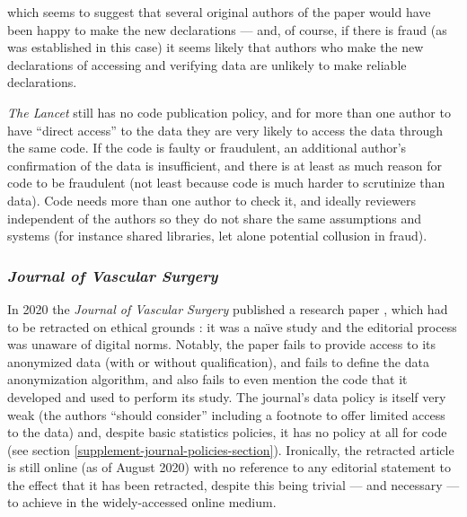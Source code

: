 \documentclass[10pt,a4paper]{article}
\begin{document}
which seems to suggest that several original authors of the paper would have been happy to make the new declarations --- and, of course, if there is fraud (as was established in this case) it seems likely that authors who make the new declarations of accessing and verifying data are unlikely to make reliable declarations. 

\emph{The Lancet\/} still has no code publication policy, and for more than one author to have ``direct access'' to the data they are very likely to access the data through the same code. If the code is faulty or fraudulent, an additional author's confirmation of the data is insufficient, and there is at least as much reason for code to be fraudulent (not least because code is much harder to scrutinize than data). Code needs more than one author to check it, and ideally reviewers independent of the authors so they do not share the same assumptions and systems (for instance shared libraries, let alone potential collusion in fraud).

\subsubsection{\emph{Journal of Vascular Surgery}}\label{supplement-vascular-surgery-note}
In 2020 the \emph{Journal of Vascular Surgery\/} published a research paper \cite{jvs1}, which had to be retracted on ethical grounds \cite{jvs2,jvs3}: it was a na\"\i ve study and the editorial process was unaware of digital norms. Notably, the paper fails to provide access to its anonymized data (with or without qualification), and fails to define the data anonymization algorithm, and also fails to even mention the code that it developed and used to perform its study. The journal's data policy is itself very weak (the authors ``should consider'' including a footnote to offer limited access to the data) and, despite basic statistics policies, it has no policy at all for code (see section \ref{supplement-journal-policies-section}). Ironically, the retracted article \cite{jvs1} is still online (as of August 2020) with no reference to any editorial statement to the effect that it has been retracted, despite this being trivial --- and necessary --- to achieve in the widely-accessed online medium.
\end{document}
